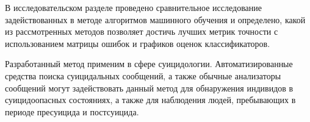 В исследовательском разделе проведено сравнительное исследование задействованных в методе алгоритмов машинного обучения и определено, какой из рассмотренных методов позволяет достичь лучших метрик точности с использованием матрицы ошибок и графиков оценок классификаторов.

Разработанный метод применим в сфере суицидологии. 
Автоматизированные средства поиска суицидальных сообщений, а также обычные анализаторы сообщений могут задействовать данный метод для обнаружения индивидов в суицидоопасных состояниях, а также для наблюдения людей, пребывающих в периоде пресуицида и постсуицида.

\pagebreak